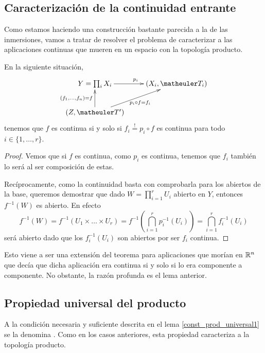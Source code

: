 \subsection{Caracterización de la continuidad entrante}
Como estamos haciendo una construcción bastante parecida a la de las inmersiones, vamos a tratar de resolver el problema de caracterizar a las aplicaciones continuas que mueren en un espacio con la topología producto.

\begin{lem}
	\label{const_prod_universal1}
	En la siguiente situación,
	\[\xymatrix{
		Y=\prod_i X_i \ar[r]^{p_i} & 
		(X_i,\T_i) \\
		(Z,\T') \ar[u]^{(f_1,\dots,f_n)=f} \ar[ru]_{p_i\circ f=f_i} &
	}\]
	tenemos que $f$ es continua si y solo si $f_i\stackrel{!}{=}p_i\circ f$ es continua para todo $i\in\{1,\dots,r\}$.
\end{lem}
\begin{proof}
	Vemos que si $f$ es continua, como $p_i$ es continua, tenemos que $f_i$ también lo será al ser composición de estas.
	
	Recíprocamente, como la continuidad basta con comprobarla para los abiertos de la base, queremos demostrar que dado $W=\prod_{i=1}^rU_i$ abierto en $Y$, entonces $f^{-1}(W)$ es abierto. En efecto
	\[f^{-1}(W)=f^{-1}(U_1\times\dots\times U_r)=f^{-1}\left(\bigcap_{i=1}^r p_i^{-1}(U_i)\right)=\bigcap_{i=1}^r f_i^{-1}(U_i)\] será abierto dado que los $f_i^{-1}(U_i)$ son abiertos por ser $f_i$ continua.
\end{proof}
\begin{obs}[Extensión]
	Esto viene a ser una extensión del teorema para aplicaciones que morían en $\mathbb{R}^n$ que decía que dicha aplicación era continua si y solo si lo era componente a componente. No obstante, la razón profunda es el lema anterior.
\end{obs} 
\subsection{Propiedad universal del producto}

A la condición necesaria y suficiente descrita en el lema \ref{const_prod_universal1} se la denomina . Como en los casos anteriores, esta propiedad caracteriza a la topología producto.

